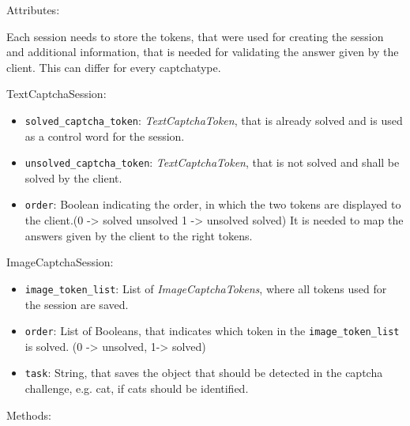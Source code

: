 Attributes:


Each session needs to store the tokens, that were used for creating the session and additional information, that is needed for validating the answer given by the client. This can differ for every captchatype. 

TextCaptchaSession:

\begin{itemize} 
\item \verb|solved_captcha_token|: \emph{TextCaptchaToken}, that is already solved and is used as a control word for the session.
\item \verb|unsolved_captcha_token|: \emph{TextCaptchaToken}, that is not solved and shall be solved by the client.
\item \verb|order|: Boolean indicating the order, in which the two tokens are displayed to the client.(0 -> solved unsolved 1 -> unsolved solved) It is needed to map the answers given by the client to the right tokens.
\end{itemize}


ImageCaptchaSession:

\begin{itemize}
\item \verb|image_token_list|: List of \emph{ImageCaptchaTokens}, where all tokens used for the session are saved.
\item \verb|order|: List of Booleans, that indicates which token in the \verb|image_token_list| is solved. (0 -> unsolved, 1-> solved)
\item \verb|task|: String, that saves the object that should be detected in the captcha challenge, e.g. cat, if cats should be identified.
\end{itemize}

Methods: 


